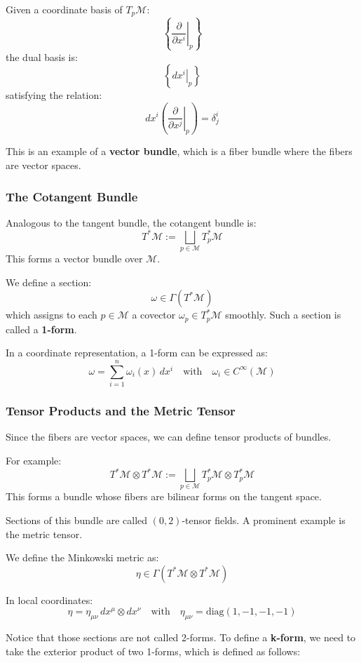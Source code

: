 Given a coordinate basis of $T_p \mathcal{M}$:
\[
\left\{ \left. \frac{\partial}{\partial x^i} \right|_p \right\}
\]
the dual basis is:
\[
\left\{ \left. dx^i \right|_p \right\}
\]
satisfying the relation:
\[
dx^i\left( \left. \frac{\partial}{\partial x^j} \right|_p \right) = \delta^i_j
\]


This is an example of a \textbf{vector bundle}, which is a fiber bundle where the fibers are vector spaces.



\subsubsection*{The Cotangent Bundle}

Analogous to the tangent bundle, the cotangent bundle is:
\[
T^*\mathcal{M} := \bigsqcup_{p \in \mathcal{M}} T_p^* \mathcal{M}
\]
This forms a vector bundle over $\mathcal{M}$.

We define a section:
\[
\omega \in \Gamma(T^* \mathcal{M})
\]
which assigns to each $p \in \mathcal{M}$ a covector $\omega_p \in T_p^*\mathcal{M}$ smoothly. Such a section is called a \textbf{1-form}.

In a coordinate representation, a 1-form can be expressed as:
\[
\omega = \sum_{i=1}^n \omega_i(x) \, dx^i
\quad \text{with} \quad \omega_i \in C^\infty(\mathcal{M})
\]

\subsubsection*{Tensor Products and the Metric Tensor}

Since the fibers are vector spaces, we can define tensor products of bundles.

For example:
\[
T^*\mathcal{M} \otimes T^*\mathcal{M} := \bigsqcup_{p \in \mathcal{M}} T_p^*\mathcal{M} \otimes T_p^*\mathcal{M}
\]
This forms a bundle whose fibers are bilinear forms on the tangent space.

Sections of this bundle are called \((0,2)\)-tensor fields. A prominent example is the metric tensor.

We define the Minkowski metric as:
\[
\eta \in \Gamma(T^*\mathcal{M} \otimes T^*\mathcal{M})
\]

In local coordinates:
\[
\eta = \eta_{\mu\nu} \, dx^\mu \otimes dx^\nu
\quad \text{with} \quad \eta_{\mu\nu} = \text{diag}(1, -1, -1, -1)
\]

Notice that those sections are not called 2-forms. To define a \textbf{k-form}, we need to take the exterior product of two 1-forms, which is defined as follows:

